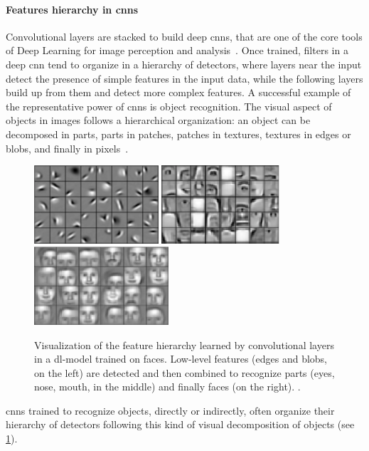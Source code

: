 \paragraph{Features hierarchy in \glspl{cnn}}
Convolutional layers are stacked to build deep \glspl{cnn}, that are one of the core tools of Deep Learning for image perception and analysis~\cite{krizhevsky2012imagenet,sermanet2013overfeat,simonyan2014very,he2015delving,he2016deep,xie2017aggregated}.
Once trained, filters in a deep \gls{cnn} tend to organize in a hierarchy of detectors, where layers near the input detect the presence of simple features in the input data, while the following layers build up from them and detect more complex features.
A successful example of the representative power of \glspl{cnn} is object recognition.
The visual aspect of objects in images follows a hierarchical organization: an object can be decomposed in parts, parts in patches, patches in textures, textures in edges or blobs, and finally in pixels~\cite{}.
\begin{figure}
    \centering
    \includegraphics[height=2.9cm]{feat-hier-1.png}%
    \hfill%
    \includegraphics[height=2.9cm]{feat-hier-2.png}%
    \hfill%
    \includegraphics[height=2.9cm]{feat-hier-3.png}%
    \newline
    \caption{
    Visualization of the feature hierarchy learned by convolutional layers in a \gls{dl}-model trained on faces.
    Low-level features (edges and blobs, on the left) are detected and then combined to recognize parts (eyes, nose, mouth, in the middle) and finally faces (on the right).
    .
    }
    \label{fig:back:filter-hier}
\end{figure}
\Glspl{cnn} trained to recognize objects, directly or indirectly, often organize their hierarchy of detectors following this kind of visual decomposition of objects (see \ref{fig:back:filter-hier}).


